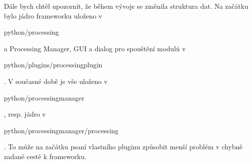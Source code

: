 Dále bych chtěl upozornit, že během vývoje se změnila struktura
dat. Na začátku bylo jádro frameworku uloženo
v \begin{scriptsize}python/processing\end{scriptsize} a Processing
Manager, GUI a dialog pro spouštění modulů
v \begin{scriptsize}python/plugins/processingplugin\end{scriptsize}. V
současné době je vše uloženo
v \begin{scriptsize}python/processingmanager\end{scriptsize},
resp. jádro
v \begin{scriptsize}python/processingmanager/processing\end{scriptsize}. To
může na začátku psaní vlastního pluginu způsobit menší problém v
chybně zadané cestě k frameworku.

\newpage
